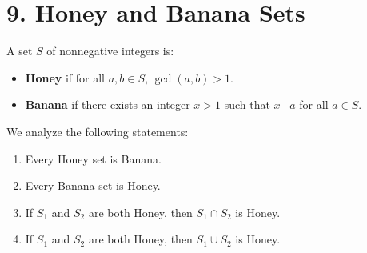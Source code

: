 \documentclass[11pt]{article}
\begin{document}
\section*{9. Honey and Banana Sets}

A set $S$ of nonnegative integers is:
\begin{itemize}
  \item \textbf{Honey} if for all $a,b\in S$, $\gcd(a,b)>1$.
  \item \textbf{Banana} if there exists an integer $x>1$ such that $x\mid a$ for all $a\in S$.
\end{itemize}

We analyze the following statements:
\begin{enumerate}
  \item Every Honey set is Banana.
  \item Every Banana set is Honey.
  \item If $S_1$ and $S_2$ are both Honey, then $S_1\cap S_2$ is Honey.
  \item If $S_1$ and $S_2$ are both Honey, then $S_1\cup S_2$ is Honey.
\end{enumerate}
\end{document}
